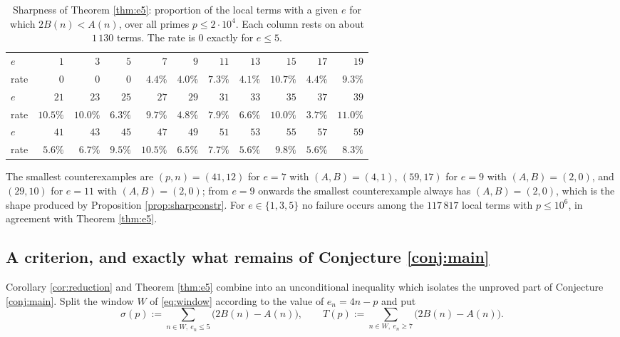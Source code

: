 \documentclass[11pt,reqno]{amsart}
\theoremstyle{plain}
\theoremstyle{definition}
\numberwithin{equation}{section}
\begin{document}
\begin{table}[ht]
\caption{Sharpness of Theorem \ref{thm:e5}: proportion of the local terms with a given
$e$ for which $2B(n)<A(n)$, over all primes $p\le2\cdot10^{4}$. Each column rests on
about $1\,130$ terms. The rate is $0$ exactly for $e\le5$.}\label{tab:e5}
\centering\small
\begin{tabular}{l*{10}{r}}
\toprule
$e$ & $1$ & $3$ & $5$ & $7$ & $9$ & $11$ & $13$ & $15$ & $17$ & $19$\\
 rate & $0$ & $0$ & $0$ & $4.4\%$ & $4.0\%$ & $7.3\%$ & $4.1\%$ & $10.7\%$ & $4.4\%$ & $9.3\%$\\
\midrule
$e$ & $21$ & $23$ & $25$ & $27$ & $29$ & $31$ & $33$ & $35$ & $37$ & $39$\\
 rate & $10.5\%$ & $10.0\%$ & $6.3\%$ & $9.7\%$ & $4.8\%$ & $7.9\%$ & $6.6\%$ & $10.0\%$ & $3.7\%$ & $11.0\%$\\
\midrule
$e$ & $41$ & $43$ & $45$ & $47$ & $49$ & $51$ & $53$ & $55$ & $57$ & $59$\\
 rate & $5.6\%$ & $6.7\%$ & $9.5\%$ & $10.5\%$ & $6.5\%$ & $7.7\%$ & $5.6\%$ & $9.8\%$ & $5.6\%$ & $8.3\%$\\
\bottomrule
\end{tabular}
\end{table}

The smallest counterexamples are $(p,n)=(41,12)$ for $e=7$ with $(A,B)=(4,1)$,
$(59,17)$ for $e=9$ with $(A,B)=(2,0)$, and $(29,10)$ for $e=11$ with $(A,B)=(2,0)$;
from $e=9$ onwards the smallest counterexample always has $(A,B)=(2,0)$, which is the
shape produced by Proposition \ref{prop:sharpconstr}. For $e\in\{1,3,5\}$ no failure
occurs among the $117\,817$ local terms with $p\le10^{6}$, in agreement with Theorem
\ref{thm:e5}.

\subsection{A criterion, and exactly what remains of Conjecture \ref{conj:main}}
\label{sec:criterion}

Corollary \ref{cor:reduction} and Theorem \ref{thm:e5} combine into an unconditional
inequality which isolates the unproved part of Conjecture \ref{conj:main}. Split the
window $W$ of \eqref{eq:window} according to the value of $e_{n}=4n-p$ and put
\begin{equation}\label{eq:sigmaT}
  \sigma(p):=\sum_{n\in W,\ e_{n}\le5}\bigl(2B(n)-A(n)\bigr),\qquad
  T(p):=\sum_{n\in W,\ e_{n}\ge7}\bigl(2B(n)-A(n)\bigr).
\end{equation}
\end{document}
